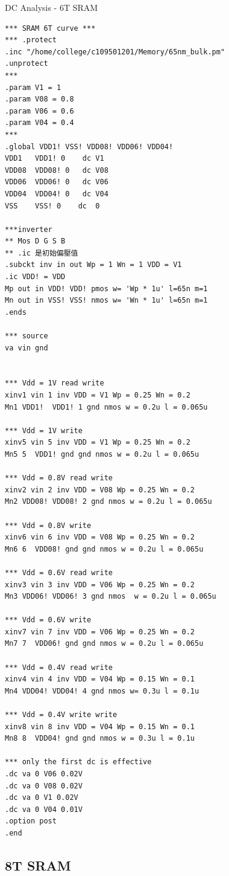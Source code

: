 \documentclass[a4paper]{article}
\newenvironment{code}{\captionsetup{type=listing, font=large, name=List.}}{}
\begin{document}
\begin{code}
\caption{DC Analysis - 6T SRAM}
\label{inv}
\begin{verbatim}
*** SRAM 6T curve ***
*** .protect
.inc "/home/college/c109501201/Memory/65nm_bulk.pm"
.unprotect
*** 
.param V1 = 1
.param V08 = 0.8
.param V06 = 0.6
.param V04 = 0.4
***
.global VDD1! VSS! VDD08! VDD06! VDD04!
VDD1   VDD1! 0    dc V1
VDD08  VDD08! 0   dc V08
VDD06  VDD06! 0   dc V06
VDD04  VDD04! 0   dc V04
VSS    VSS! 0    dc  0

***inverter
** Mos D G S B
** .ic 是初始偏壓值
.subckt inv in out Wp = 1 Wn = 1 VDD = V1
.ic VDD! = VDD 
Mp out in VDD! VDD! pmos w= 'Wp * 1u' l=65n m=1
Mn out in VSS! VSS! nmos w= 'Wn * 1u' l=65n m=1
.ends

*** source
va vin gnd


*** Vdd = 1V read write
xinv1 vin 1 inv VDD = V1 Wp = 0.25 Wn = 0.2
Mn1 VDD1!  VDD1! 1 gnd nmos w = 0.2u l = 0.065u 

*** Vdd = 1V write 
xinv5 vin 5 inv VDD = V1 Wp = 0.25 Wn = 0.2
Mn5 5  VDD1! gnd gnd nmos w = 0.2u l = 0.065u

*** Vdd = 0.8V read write
xinv2 vin 2 inv VDD = V08 Wp = 0.25 Wn = 0.2
Mn2 VDD08! VDD08! 2 gnd nmos w = 0.2u l = 0.065u

*** Vdd = 0.8V write
xinv6 vin 6 inv VDD = V08 Wp = 0.25 Wn = 0.2
Mn6 6  VDD08! gnd gnd nmos w = 0.2u l = 0.065u

*** Vdd = 0.6V read write
xinv3 vin 3 inv VDD = V06 Wp = 0.25 Wn = 0.2
Mn3 VDD06! VDD06! 3 gnd nmos  w = 0.2u l = 0.065u

*** Vdd = 0.6V write
xinv7 vin 7 inv VDD = V06 Wp = 0.25 Wn = 0.2
Mn7 7  VDD06! gnd gnd nmos w = 0.2u l = 0.065u

*** Vdd = 0.4V read write
xinv4 vin 4 inv VDD = V04 Wp = 0.15 Wn = 0.1
Mn4 VDD04! VDD04! 4 gnd nmos w= 0.3u l = 0.1u

*** Vdd = 0.4V write write
xinv8 vin 8 inv VDD = V04 Wp = 0.15 Wn = 0.1
Mn8 8  VDD04! gnd gnd nmos w = 0.3u l = 0.1u

*** only the first dc is effective
.dc va 0 V06 0.02V
.dc va 0 V08 0.02V
.dc va 0 V1 0.02V
.dc va 0 V04 0.01V
.option post
.end
\end{verbatim}
\end{code}

\subsection{8T SRAM}
\end{document}
